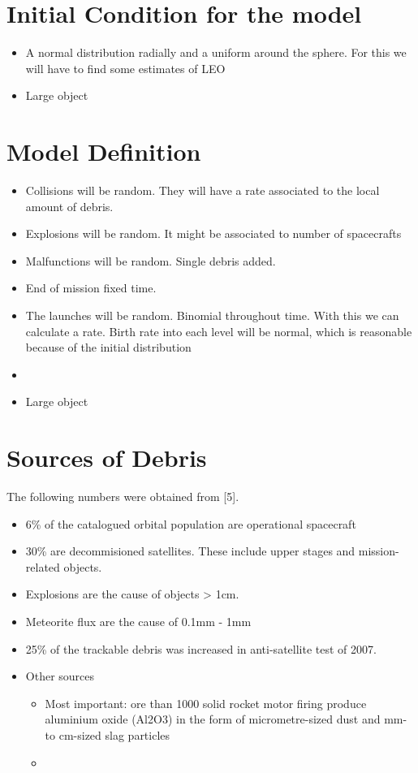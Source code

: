 \documentclass{article}
\theoremstyle{definition}
\begin{document}
\begin{enumerat}
\section*{Initial Condition for the model}

\begin{itemize}
  \item A normal distribution radially and a uniform around the sphere. For this we will have to find some estimates of LEO 
  \item Large object
\end{itemize}

\section*{Model Definition}

\begin{itemize}
  \item Collisions will be random. They will have a rate associated to the local amount of debris.
  \item Explosions will be random. It might be associated to number of spacecrafts
  \item Malfunctions will be random. Single debris added.
  \item End of mission fixed time. 
  \item The launches will be random. Binomial throughout time. With this we can calculate a rate. Birth rate into each level will be normal, which is reasonable because of the initial distribution
  \item 
  \item Large object
\end{itemize}

\section*{Sources of Debris}

The following numbers were obtained from [5].

\begin{itemize}
  \item 6\% of the catalogued orbital population are operational spacecraft
  \item 30\% are decommisioned satellites. These include upper stages and mission-related objects.
  \item Explosions are the cause of objects > 1cm.
  \item Meteorite flux are the cause of 0.1mm - 1mm
  \item 25\% of the trackable debris was increased in anti-satellite test of 2007.
  \item Other sources
  \begin{itemize}
  	\item{Most important: ore than 1000 solid rocket motor firing produce aluminium oxide (Al2O3) in the form of micrometre-sized dust and mm- to cm-sized slag particles}
  	\item{}
  \end{itemize}


\end{itemize}
\end{enumerat}
\end{document}
